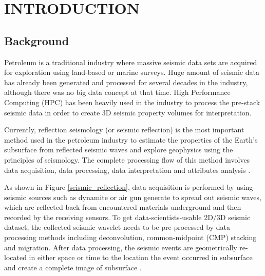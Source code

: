 %
%
%



\pagestyle{plain} %
\setcounter{page}{1}


\chapter{\uppercase {Introduction}}

\section{Background}
Petroleum is a traditional industry where massive seismic data sets are acquired for exploration using land-based or marine surveys. Huge amount of seismic data has already been generated and processed for several decades in the industry, although there was no big data concept at that time. High Performance Computing (HPC) has been heavily used in the industry to process the pre-stack seismic data in order to create 3D seismic property volumes for interpretation. 

Currently, reflection seismology (or seismic reflection) is the most important method used in the petroleum industry to estimate the properties of the Earth's subsurface from reflected seismic waves and explore geophysics using the principles of seismology. The complete processing flow of this method involves data acquisition, data processing, data interpretation and attributes analysis \cite{seisreflectionwiki}. 

As shown in Figure \ref{seismic_reflection}, data acquisition is performed by using seismic sources such as dynamite or air gun generate to spread out seismic waves, which are reflected back from encountered materials underground and then recorded by the receiving sensors. To get data-scientists-usable 2D/3D seismic dataset, the collected seismic wavelet needs to be pre-processed by data processing methods including deconvolution, common-midpoint (CMP) stacking and migration. After data processing, the seismic events are geometrically re-located in either space or time to the location the event occurred in subsurface and create a complete image of subsurface \cite{seisreflectionwiki}. 

